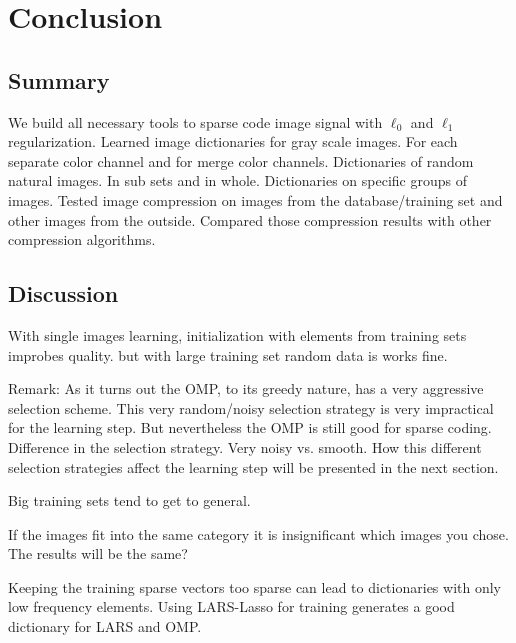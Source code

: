 \chapter{Conclusion}

\section{Summary} %

We build all necessary tools to sparse code image signal with $\ell_0$ and
$\ell_1$ regularization. Learned image dictionaries for gray scale images. For
each separate color channel and for merge color channels. Dictionaries of
random natural images. In sub sets and in whole. Dictionaries on specific
groups of images. Tested image compression on images from the
database/training set and other images from the outside. 
Compared those compression results with other compression algorithms.

\section{Discussion}

With single images learning, initialization with elements from training sets
improbes quality. but with large training set random data is works fine.


Remark:
As it turns out the OMP, to its greedy nature, has a very aggressive selection
scheme. This very random/noisy selection strategy is very impractical
for the \trainDL learning step. But nevertheless the OMP is still good for
sparse coding. 
Difference in the selection strategy.
Very noisy vs. smooth. 
How this different selection strategies affect the learning step will be
presented in the next section.

Big training sets tend to get to general.

If the images fit into the same category it is insignificant which images you
chose. The results will be the same?

Keeping the training sparse vectors too sparse can lead to dictionaries with
only low frequency elements. Using LARS-Lasso for training generates a good
dictionary for LARS and OMP. 




